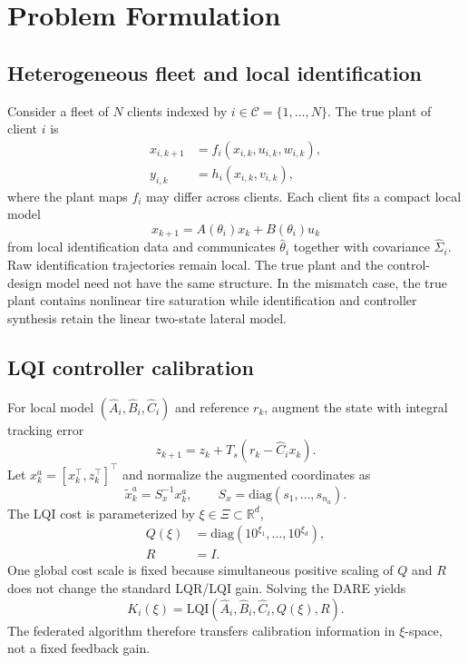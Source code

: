 \documentclass[conference]{IEEEtran}
\begin{document}
\section{Problem Formulation}
\label{sec:problem}
\subsection{Heterogeneous fleet and local identification}
Consider a fleet of $N$ clients indexed by $i\in\mathcal{C}=\{1,\ldots,N\}$. The true plant of client $i$ is
\begin{align}
    x_{i,k+1} &= f_i(x_{i,k},u_{i,k},w_{i,k}), \\
    y_{i,k} &= h_i(x_{i,k},v_{i,k}),
\end{align}
where the plant maps $f_i$ may differ across clients. Each client fits a compact local model
\begin{equation}
    x_{k+1}=A(\theta_i)x_k+B(\theta_i)u_k
\end{equation}
from local identification data and communicates $\hat\theta_i$ together with covariance $\hat\Sigma_i$. Raw identification trajectories remain local. The true plant and the control-design model need not have the same structure. In the mismatch case, the true plant contains nonlinear tire saturation while identification and controller synthesis retain the linear two-state lateral model.

\subsection{LQI controller calibration}
For local model $(\hat A_i,\hat B_i,\hat C_i)$ and reference $r_k$, augment the state with integral tracking error
\begin{equation}
    z_{k+1}=z_k+T_s(r_k-\hat C_i x_k).
\end{equation}
Let $x_k^a=[x_k^\top,z_k^\top]^\top$ and normalize the augmented coordinates as
\begin{equation}
    \tilde x_k^a=S_x^{-1}x_k^a,
    \qquad S_x=\mathrm{diag}(s_1,\ldots,s_{n_a}).
\end{equation}
The LQI cost is parameterized by $\xi\in\Xi\subset\mathbb{R}^{d}$,
\begin{align}
    Q(\xi)&=\mathrm{diag}(10^{\xi_1},\ldots,10^{\xi_d}),\\
    R&=I.
\end{align}
One global cost scale is fixed because simultaneous positive scaling of $Q$ and $R$ does not change the standard LQR/LQI gain. Solving the DARE yields
\begin{equation}
    K_i(\xi)=\mathrm{LQI}(\hat A_i,\hat B_i,\hat C_i,Q(\xi),R).
\end{equation}
The federated algorithm therefore transfers calibration information in $\xi$-space, not a fixed feedback gain.
\end{document}
